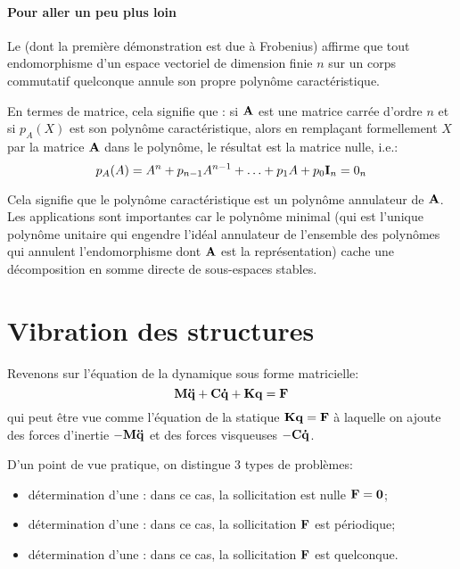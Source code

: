 \medskip
{}
\paragraph{Pour aller un peu plus loin}
Le  
(dont la première démonstration est due à Frobenius)
affirme que tout endomorphisme d'un espace vectoriel de dimension finie $n$ sur un corps commutatif quelconque 
annule son propre polynôme caractéristique.

En termes de matrice, cela signifie que : si $\MM{A}$ est une matrice carrée d'ordre $n$ et si 
$p_A(X)$ est son polynôme caractéristique, alors en remplaçant formellement 
$X$ par la matrice $\MM{A}$ dans le polynôme, le résultat est la matrice nulle, i.e.:
\begin{equation}p_A(A)= A^n + p_{n-1}A^{n-1} + \ldots + p_1 A + p_0 \MM{I}_n = 0_n \end{equation}

Cela signifie que le polynôme caractéristique est un 
polynôme annulateur de $\MM{A}$.
Les applications sont importantes car le polynôme minimal (qui est l'unique polynôme unitaire qui
engendre l'idéal annulateur de l'ensemble des polynômes qui annulent l'endomorphisme dont $\MM{A}$
est la représentation) cache une décomposition en somme  directe de sous-espaces stables. 










\medskip
\section{Vibration des structures}

\medskip
Revenons sur l'équation de la dynamique sous forme matricielle:
\begin{equation} \MM{M}\VV{\ddot{q}}+\MM{C}\VV{\dot{q}}+\MM{K}\VV{q}=\VV{F} \end{equation}
qui peut être vue comme l'équation de la statique $\MM{K}\VV{q}=\VV{F}$ à laquelle on
ajoute des forces d'inertie $-\MM{M}\VV{\ddot{q}}$ et des forces visqueuses
$-\MM{C}\VV{\dot{q}}$.

\medskip
D'un point de vue pratique, on distingue 3 types de problèmes:
\begin{itemize}
   \item détermination d'une : 
	dans ce cas, la sollicitation est nulle $\VV{F} = \VV{0}$;
   \item détermination d'une :
 	dans ce cas, la sollicitation $\VV{F}$ est périodique;
   \item détermination d'une : 
	dans ce cas, la sollicitation $\VV{F}$ est quelconque.
\end{itemize}

